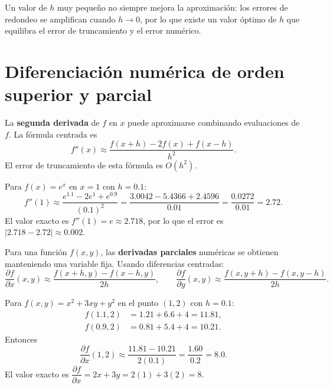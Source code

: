\documentclass[a4,11pt]{aleph-notas}
\begin{document}
\begin{advertencia}
    Un valor de $h$ muy pequeño no siempre mejora la aproximación: los errores de redondeo se amplifican cuando $h\to 0$, por lo que existe un valor óptimo de $h$ que equilibra el error de truncamiento y el error numérico.
\end{advertencia}


\section{Diferenciación numérica de orden superior y parcial}

\begin{defi}
    La \textbf{segunda derivada} de $f$ en $x$ puede aproximarse combinando evaluaciones de $f$. La fórmula centrada es
    \[
        f''(x)\approx\frac{f(x+h)-2f(x)+f(x-h)}{h^2}.
    \]
    El error de truncamiento de esta fórmula es $O(h^2)$.
\end{defi}

\begin{ejem}
    Para $f(x)=e^x$ en $x=1$ con $h=0.1$:
    \[
        f''(1)\approx\frac{e^{1.1}-2e^{1}+e^{0.9}}{(0.1)^2}=\frac{3.0042-5.4366+2.4596}{0.01}=\frac{0.0272}{0.01}=2.72.
    \]
    El valor exacto es $f''(1)=e\approx 2.718$, por lo que el error es $|2.718-2.72|\approx 0.002$.
\end{ejem}

\begin{defi}
    Para una función $f(x,y)$, las \textbf{derivadas parciales} numéricas se obtienen manteniendo una variable fija. Usando diferencias centradas:
    \[
        \frac{\partial f}{\partial x}(x,y)\approx\frac{f(x+h,y)-f(x-h,y)}{2h},
        \qquad
        \frac{\partial f}{\partial y}(x,y)\approx\frac{f(x,y+h)-f(x,y-h)}{2h}.
    \]
\end{defi}

\begin{ejem}
    Para $f(x,y)=x^2+3xy+y^2$ en el punto $(1,2)$ con $h=0.1$:
    \begin{align*}
        f(1.1,2)&=1.21+6.6+4=11.81,\\
        f(0.9,2)&=0.81+5.4+4=10.21.
    \end{align*}
    Entonces
    \[
        \frac{\partial f}{\partial x}(1,2)\approx\frac{11.81-10.21}{2(0.1)}=\frac{1.60}{0.2}=8.0.
    \]
    El valor exacto es $\dfrac{\partial f}{\partial x}=2x+3y=2(1)+3(2)=8$.
\end{ejem}
\end{document}
